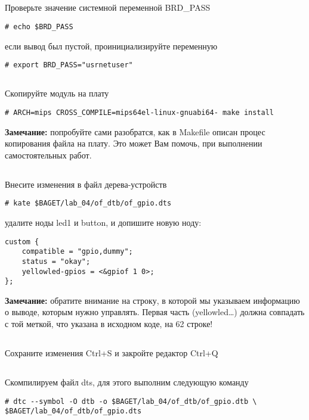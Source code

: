 \subsection{}Проверьте значение системной переменной BRD\_PASS  
\begin{lstlisting}[style=bash]
# echo $BRD_PASS
\end{lstlisting}
если вывод был пустой, проинициализируйте переменную 
\begin{lstlisting}[style=bash]
# export BRD_PASS="usrnetuser" 
\end{lstlisting}

\subsection{}Скопируйте модуль на плату
\begin{lstlisting}[style=bash]
	# ARCH=mips CROSS_COMPILE=mips64el-linux-gnuabi64- make install
\end{lstlisting}
\textbf{Замечание:} попробуйте сами разобратся, как в Makefile описан процес копирования файла на плату. Это может Вам помочь, при выполнении самостоятельных работ.

\subsection{}Внесите изменения в файл дерева-устройств 
\begin{lstlisting}[style=bash]
# kate $BAGET/lab_04/of_dtb/of_gpio.dts
\end{lstlisting}
удалите ноды led1 и button, и допишите новую ноду:
\begin{lstlisting}[style=stdout]
custom {
	compatible = "gpio,dummy";
	status = "okay";
	yellowled-gpios = <&gpiof 1 0>;
};
\end{lstlisting}
\textbf{Замечание:} обратите внимание на строку, в которой мы указываем информацию о выводе, которым нужно управлять. Первая часть (yellowled…) должна совпадать с той меткой, что указана в исходном коде, на 62 строке!

\subsection{}Сохраните изменения Ctrl+S и закройте редактор Ctrl+Q 

\subsection{}Скомпилируем файл dts, для этого выполним следующую команду
\begin{lstlisting}[style=bash]
# dtc --symbol -O dtb -o $BAGET/lab_04/of_dtb/of_gpio.dtb \
$BAGET/lab_04/of_dtb/of_gpio.dts
\end{lstlisting}

